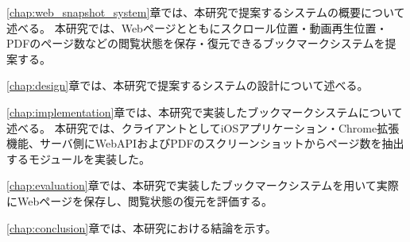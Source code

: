 \ref{chap:web_snapshot_system}章では、本研究で提案するシステムの概要について述べる。
本研究では、Webページとともにスクロール位置・動画再生位置・PDFのページ数などの閲覧状態を保存・復元できるブックマークシステムを提案する。

\ref{chap:design}章では、本研究で提案するシステムの設計について述べる。

\ref{chap:implementation}章では、本研究で実装したブックマークシステムについて述べる。
本研究では、クライアントとしてiOSアプリケーション・Chrome拡張機能、サーバ側にWebAPIおよびPDFのスクリーンショットからページ数を抽出するモジュールを実装した。

\ref{chap:evaluation}章では、本研究で実装したブックマークシステムを用いて実際にWebページを保存し、閲覧状態の復元を評価する。

\ref{chap:conclusion}章では、本研究における結論を示す。